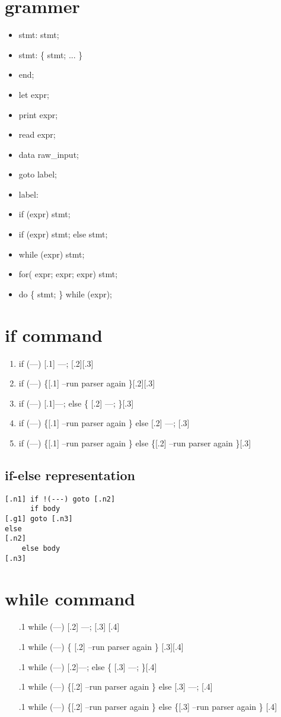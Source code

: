 \documentclass{article}
\begin{document}
\section{grammer}
\begin{itemize}
\item
stmt: stmt;
\item
stmt: \{ stmt; ...  \}
\item
end;
\item
let expr;
\item
print expr;
\item
read expr;
\item
data raw\_input;
\item
goto label;
\item
label:
\item
if (expr) stmt;
\item
if (expr) stmt; else stmt;
\item
while (expr) stmt;
\item
for( expr; expr; expr) stmt;
\item
do \{ stmt; \} while (expr);
\end{itemize}


\section{if command}
\begin{enumerate}
\item
if (---) [.1] ---; [.2][.3]
\item
if (---) \{[.1]
	--run parser again
\}[.2][.3]
\item
if (---) [.1]---; else \{
	[.2] 	---; 
\}[.3]
\item
if (---) \{[.1]
	--run parser again
\} else [.2] ---; [.3]
\item
if (---) \{[.1]
	--run parser  again
\} else \{[.2]
	--run parser  again
\}[.3]
\end{enumerate}

\subsection{if-else representation}
\begin{lstlisting}
[.n1] if !(---) goto [.n2]
	  if body
[.g1] goto [.n3]
else
[.n2] 
	else body
[.n3]
\end{lstlisting}

\section{while command}
\begin{enumerate}
\item
[.1]while (---) [.2] ---; 
[.3]
[.4]
\item
[.1]while (---) \{
	[.2]
	--run parser again
\}
[.3][.4]
\item
[.1]while (---) [.2]---; else \{
	[.3] 	---; 
\}[.4]
\item
[.1]while (---) \{[.2]
	--run parser again
\} else [.3] ---; 
[.4]
\item
[.1]while (---) \{[.2]
	--run parser  again
\} else \{[.3]
	--run parser  again
\}
[.4]
\end{enumerate}
\end{document}
